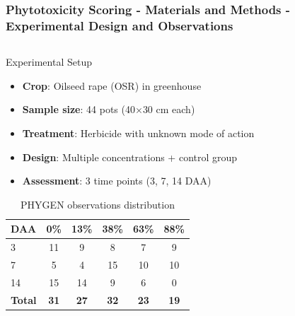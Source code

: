 \documentclass[aspectratio=43]{beamer}
\begin{document}
\begin{frame}
    \frametitle{\small Phytotoxicity Scoring - Materials and Methods - Experimental Design and Observations}
    
    \begin{columns}
        \begin{column}{0.6\textwidth}
            \begin{block}{Experimental Setup}
                \scriptsize
                \begin{itemize}
                    \item \textbf{Crop}: Oilseed rape (OSR) in greenhouse
                    \item \textbf{Sample size}: 44 pots (40\ensuremath{\times}30 cm each)
                    \item \textbf{Treatment}: Herbicide with unknown mode of action
                    \item \textbf{Design}: Multiple concentrations + control group
                    \item \textbf{Assessment}: 3 time points (3, 7, 14 DAA)
                \end{itemize}
            \end{block}
            
            \begin{table}[H]
                \centering
                \scriptsize
                \caption{PHYGEN observations distribution}
                \begin{tabular}{|l|c|c|c|c|c|}
                \hline
                \textbf{DAA} & \textbf{0\%} & \textbf{13\%} & \textbf{38\%} & \textbf{63\%} & \textbf{88\%} \\
                \hline
                3 & 11 & 9 & 8 & 7 & 9 \\
                7 & 5 & 4 & 15 & 10 & 10 \\
                14 & 15 & 14 & 9 & 6 & 0 \\
                \hline
                \textbf{Total} & \textbf{31} & \textbf{27} & \textbf{32} & \textbf{23} & \textbf{19} \\
                \hline
                \end{tabular}
            \end{table}
        \end{column}
        

\end{columns}
\end{frame}
\end{document}
